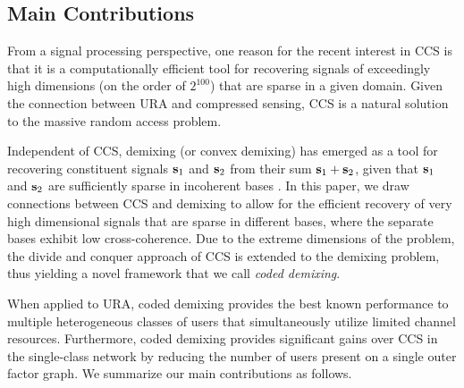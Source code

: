 \documentclass[journal]{IEEEtran}
\begin{document}
\subsection{Main Contributions}

From a signal processing perspective, one reason for the recent interest in CCS is that it is a computationally efficient tool for recovering signals of exceedingly high dimensions (on the order of $2^{100}$) that are sparse in a given domain.
Given the connection between URA and compressed sensing, CCS is a natural solution to the massive random access problem. 

Independent of CCS, demixing (or convex demixing) has emerged as a tool for recovering constituent signals $\mathbf{s}_1$ and $\mathbf{s}_2$ from their sum $\mathbf{s}_1 + \mathbf{s}_2$, given that $\mathbf{s}_1$ and $\mathbf{s}_2$ are sufficiently sparse in incoherent bases \cite{mccoy2014convexity}. 
In this paper, we draw connections between CCS and demixing to allow for the efficient recovery of very high dimensional signals that are sparse in different bases, where the separate bases exhibit low cross-coherence. %
Due to the extreme dimensions of the problem, the divide and conquer approach of CCS is extended to the demixing problem, thus yielding a novel framework that we call \textit{coded demixing}. 

When applied to URA, coded demixing provides the best known performance to  multiple heterogeneous classes of users that simultaneously utilize limited channel resources.
Furthermore, coded demixing provides significant gains over CCS in the single-class network by reducing the number of users present on a single outer factor graph.
We summarize our main contributions as follows.
\end{document}
